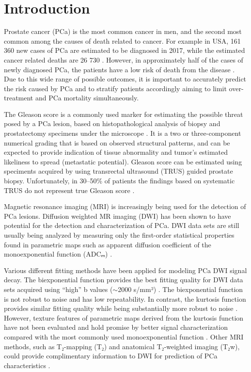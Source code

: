\section{Introduction}

Prostate cancer (PCa) is the most common cancer in men, and the second most
common among the causes of death related to cancer. For example in USA, 161 360
new cases of PCa are estimated to be diagnosed in 2017, while the estimated
cancer related deaths are 26 730 \citep{Siegel2017}. However, in approximately
half of the cases of newly diagnosed PCa, the patients have a low risk of death
from the disease \citep{Walsh2007, Draisma2003}. Due to this wide range of
possible outcomes, it is important to accurately predict the risk caused by
PCa and to stratify patients accordingly aiming to limit over-treatment and
PCa mortality simultaneously.

The Gleason score is a commonly used marker for estimating the possible threat
posed by a PCa lesion, based on histopathological analysis of biopsy and
prostatectomy specimens under the microscope \citep{Epstein2005}. It is a two or
three-component numerical grading that is based on observed structural patterns,
and can be expected to provide indication of tissue abnormality and tumor's
estimated likeliness to spread (metastatic potential). Gleason score can be
estimated using speciments acquired by using transrectal ultrasound (TRUS)
guided prostate biopsy. Unfortunately, in 30--50\% of patients the findings
based on systematic TRUS do not represent true Gleason score \citep{Nepple2009,
Steinberg1997, Rajinikanth2008}.

Magnetic resonance imaging (MRI) is increasingly being used for the detection of
PCa lesions. Diffusion weighted MR imaging (DWI) has been shown to have
potential for the detection and characterization of PCa. DWI data sets are
still usually being analyzed by measuring only the first-order statistical
properties found in parametric maps such as apparent diffusion coefficient of
the monoexponential function (ADCₘ) \citep{Turkbey2011, Toivonen2015,
Jambor2015Relaxation}.

Various different fitting methods have been applied for modeling PCa DWI signal
decay. The biexponential function \citep{Mulkern2006} provides the best fitting
quality for DWI data sets acquired using ``high'' b values ($\sim$2000 s/mm²)
\citep{Jambor2015Evaluation}. The biexponential function is not robust to
noise and has low repeatability. In contrast, the kurtosis function
\citep{Jensen2005} provides similar fitting quality while being substantially
more robust to noise \citep{Jambor2015Evaluation}. However, texture
features of parametric maps derived from the kurtosis function have not been
evaluated and hold promise by better signal characterization compared with the
most commonly used monoexponential function \citep{Toivonen2015}. Other MRI
methods, such as T₂-mapping (T₂) and anatomical T₂-weighted imaging (T₂w), could
provide complimentary information to DWI for prediction of PCa characteristics
\citep{Jambor2015Relaxation}.

